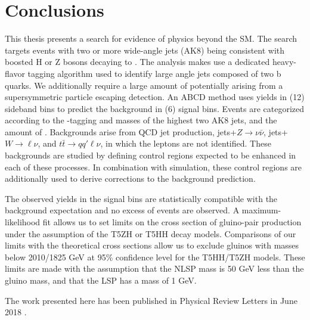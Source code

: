 \chapter{Conclusions}
\label{chap:conclusions}

This thesis presents a search for evidence of physics beyond the SM. The search targets events with two or more wide-angle jets (AK8) being consistent with boosted H or Z bosons decaying to \bbbar. The analysis makes use a dedicated heavy-flavor tagging algorithm used to identify large angle jets composed of two b quarks. We additionally require a large amount of \ptmiss potentially arising from a supersymmetric particle escaping detection. An ABCD method uses yields in (12) sideband bins to predict the background in (6) signal bins. Events are categorized according to the \bbbar-tagging and masses of the highest two \pt AK8 jets, and the amount of \ptmiss. Backgrounds arise from QCD jet production, jets+$Z\rightarrow\nu\bar{\nu}$, jets+$W\rightarrow\ell\nu$, and $t\bar{t}\rightarrow q q' \ell \nu$, in which the leptons are not identified. These backgrounds are studied by defining control regions expected to be enhanced in each of these processes. In combination with simulation, these control regions are additionally used to derive corrections to the background prediction. 

The observed yields in the signal bins are statistically compatible with the background expectation and no excess of events are observed. A maximum-likelihood fit allows us to set limits on the cross section of gluino-pair production under the assumption of the T5ZH or T5HH decay models. Comparisons of our limits with the theoretical cross sections allow us to exclude gluinos with masses below 2010/1825 GeV at 95\% confidence level for the T5HH/T5ZH models. These limits are made with the assumption that the NLSP mass is 50 GeV less than the gluino mass, and that the LSP has a mass of 1 GeV.

The work presented here has been published in Physical Review Letters in June 2018 \cite{CMS-SUS-17-006}.